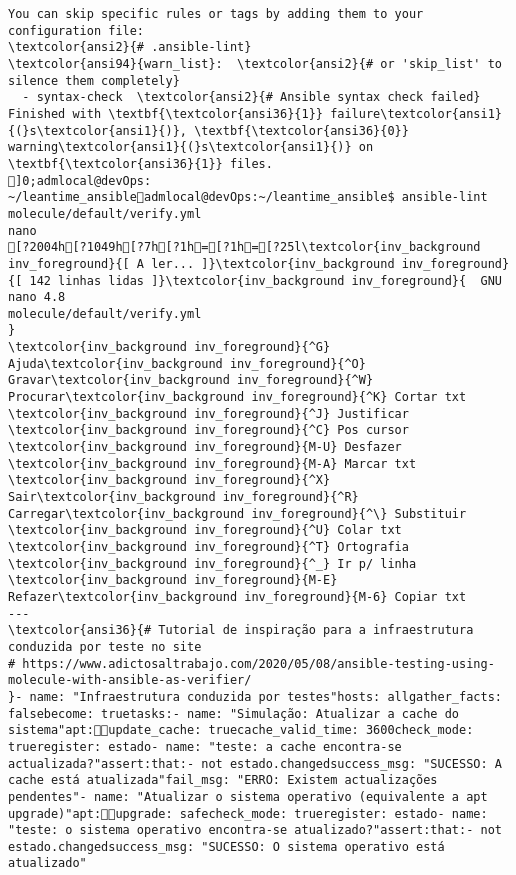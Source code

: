 \documentclass{scrartcl}
\begin{document}
\begin{Verbatim}
You can skip specific rules or tags by adding them to your configuration file:
\textcolor{ansi2}{# .ansible-lint}
\textcolor{ansi94}{warn_list}:  \textcolor{ansi2}{# or 'skip_list' to silence them completely}
  - syntax-check  \textcolor{ansi2}{# Ansible syntax check failed}
Finished with \textbf{\textcolor{ansi36}{1}} failure\textcolor{ansi1}{(}s\textcolor{ansi1}{)}, \textbf{\textcolor{ansi36}{0}} warning\textcolor{ansi1}{(}s\textcolor{ansi1}{)} on \textbf{\textcolor{ansi36}{1}} files.
]0;admlocal@devOps: ~/leantime_ansibleadmlocal@devOps:~/leantime_ansible$ ansible-lint molecule/default/verify.yml 
nano
[?2004h[?1049h[?7h[?1h=[?1h=[?25l\textcolor{inv_background inv_foreground}{[ A ler... ]}\textcolor{inv_background inv_foreground}{[ 142 linhas lidas ]}\textcolor{inv_background inv_foreground}{  GNU nano 4.8                                          molecule/default/verify.yml                                                       }
\textcolor{inv_background inv_foreground}{^G} Ajuda\textcolor{inv_background inv_foreground}{^O} Gravar\textcolor{inv_background inv_foreground}{^W} Procurar\textcolor{inv_background inv_foreground}{^K} Cortar txt    \textcolor{inv_background inv_foreground}{^J} Justificar    \textcolor{inv_background inv_foreground}{^C} Pos cursor    \textcolor{inv_background inv_foreground}{M-U} Desfazer     \textcolor{inv_background inv_foreground}{M-A} Marcar txt
\textcolor{inv_background inv_foreground}{^X} Sair\textcolor{inv_background inv_foreground}{^R} Carregar\textcolor{inv_background inv_foreground}{^\} Substituir    \textcolor{inv_background inv_foreground}{^U} Colar txt     \textcolor{inv_background inv_foreground}{^T} Ortografia    \textcolor{inv_background inv_foreground}{^_} Ir p/ linha   \textcolor{inv_background inv_foreground}{M-E} Refazer\textcolor{inv_background inv_foreground}{M-6} Copiar txt
---
\textcolor{ansi36}{# Tutorial de inspiração para a infraestrutura conduzida por teste no site
# https://www.adictosaltrabajo.com/2020/05/08/ansible-testing-using-molecule-with-ansible-as-verifier/
}- name: "Infraestrutura conduzida por testes"hosts: allgather_facts: falsebecome: truetasks:- name: "Simulação: Atualizar a cache do sistema"apt:update_cache: truecache_valid_time: 3600check_mode: trueregister: estado- name: "teste: a cache encontra-se actualizada?"assert:that:- not estado.changedsuccess_msg: "SUCESSO: A cache está atualizada"fail_msg: "ERRO: Existem actualizações pendentes"- name: "Atualizar o sistema operativo (equivalente a apt upgrade)"apt:upgrade: safecheck_mode: trueregister: estado- name: "teste: o sistema operativo encontra-se atualizado?"assert:that:- not estado.changedsuccess_msg: "SUCESSO: O sistema operativo está atualizado"

\end{Verbatim}
\end{document}
